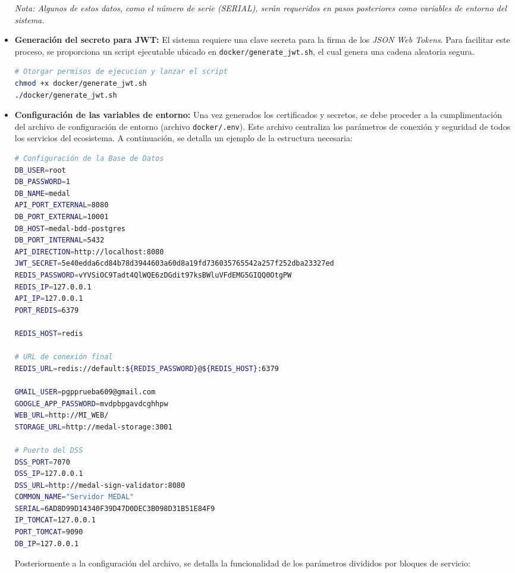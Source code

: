 \documentclass[12pt,a4paper]{report}
\begin{document}
\begin{itemize}
    \textit{Nota: Algunos de estos datos, como el número de serie (SERIAL), serán requeridos en pasos posteriores como variables de entorno del sistema.}

    \item \textbf{Generación del secreto para JWT:} El sistema requiere una clave secreta para la firma de los \textit{JSON Web Tokens}. Para facilitar este proceso, se proporciona un script ejecutable ubicado en \texttt{docker/generate\_jwt.sh}, el cual genera una cadena aleatoria segura.
    
    \begin{lstlisting}[language=bash, 
                       basicstyle=\ttfamily\footnotesize,
                       breaklines=true]
# Otorgar permisos de ejecucion y lanzar el script
chmod +x docker/generate_jwt.sh
./docker/generate_jwt.sh
    \end{lstlisting}

    \item \textbf{Configuración de las variables de entorno:} Una vez generados los certificados y secretos, se debe proceder a la cumplimentación del archivo de configuración de entorno (archivo \texttt{docker/.env}). Este archivo centraliza los parámetros de conexión y seguridad de todos los servicios del ecosistema. A continuación, se detalla un ejemplo de la estructura necesaria:

    \begin{lstlisting}[language=bash, 
                       caption={Ejemplo de archivo de configuración de variables de entorno (.env)}, 
                       label={code:env_file},
                       basicstyle=\ttfamily\scriptsize,
                       breaklines=true,
                       frame=single]
# Configuración de la Base de Datos
DB_USER=root
DB_PASSWORD=1
DB_NAME=medal
API_PORT_EXTERNAL=8080
DB_PORT_EXTERNAL=10001
DB_HOST=medal-bdd-postgres
DB_PORT_INTERNAL=5432
API_DIRECTION=http://localhost:8080
JWT_SECRET=5e40edda6cd84b78d3944603a60d8a19fd736035765542a257f252dba23327ed
REDIS_PASSWORD=vYVSiOC9Tadt4QlWQE6zDGdit97ksBWluVFdEMG5GIQQ0OtgPW
REDIS_IP=127.0.0.1
API_IP=127.0.0.1
PORT_REDIS=6379

REDIS_HOST=redis

# URL de conexión final
REDIS_URL=redis://default:${REDIS_PASSWORD}@${REDIS_HOST}:6379

GMAIL_USER=pgpprueba609@gmail.com
GOOGLE_APP_PASSWORD=mvdpbpgavdcghhpw
WEB_URL=http://MI_WEB/
STORAGE_URL=http://medal-storage:3001

# Puerto del DSS
DSS_PORT=7070
DSS_IP=127.0.0.1
DSS_URL=http://medal-sign-validator:8080
COMMON_NAME="Servidor MEDAL"
SERIAL=6AD8D99D14340F39D47D0DEC3B098D31B51E84F9
IP_TOMCAT=127.0.0.1
PORT_TOMCAT=9090
DB_IP=127.0.0.1
    \end{lstlisting}
    Posteriormente a la configuración del archivo, se detalla la funcionalidad de los parámetros divididos por bloques de servicio:


\end{itemize}
\end{document}
